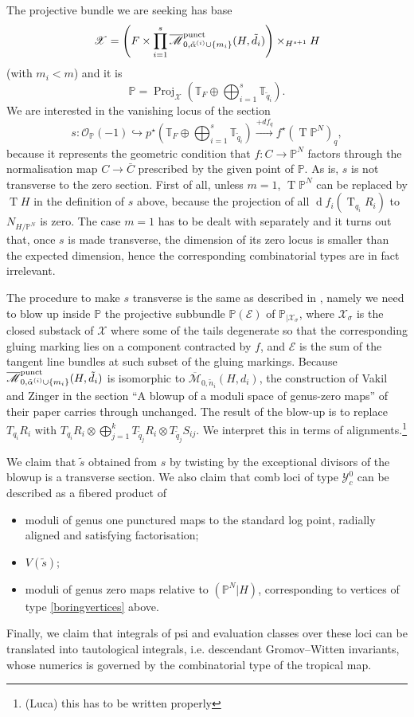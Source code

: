\documentclass[11pt]{amsart}
\newcommand{\oM}{\overline{\mathcal{M}}}
\newcommand{\M}[4]{\overline{\mathcal{M}}_{#1,#2}(#3,#4)}
\newcommand{\PP}{\mathbb P}
\newcommand{\st}{\star}
\newcommand{\OO}{\mathcal{O}}
\renewcommand{\to}{\rightarrow}
\newcommand{\Proj}{\operatorname{Proj}}
\theoremstyle{definition}
\theoremstyle{definition}
\begin{document}
The projective bundle we are seeking has base
\[\mathcal X=\left(F\times \prod_{i=1}^s\oM_{0,\tilde\alpha^{(i)}\cup\{m_i\}}^{\rm{punct}}(H,\tilde d_i)\right)\times_{H^{s+1}}H\]
(with $m_i<m$) and it is \[\PP=\Proj_{\mathcal X}\left(\mathbb T_F\oplus\bigoplus_{i=1}^s\mathbb T_{\tilde q_i}\right).\]
We are interested in the vanishing locus of the section
\[s\colon\OO_{\PP}(-1)\hookrightarrow p^\st\left(\mathbb T_F\oplus\bigoplus_{i=1}^s\mathbb T_{\tilde q_i}\right)\xrightarrow{+df_q} f^\st(\operatorname{T}\PP^N)_q,\]
because it represents the geometric condition that $f\colon C\to \PP^N$ factors through the normalisation map $C\to\bar C$ prescribed by the given point of $\PP$. As is, $s$ is not transverse to the zero section. First of all, unless $m=1$, $\operatorname{T}\PP^N$ can be replaced by $\operatorname{T}H$ in the definition of $s$ above, because the projection of all $\operatorname{d}f_i(\operatorname{T}_{q_i}R_i)$ to $N_{H/\PP^N}$ is zero. The case $m=1$ has to be dealt with separately and it turns out that, once $s$ is made transverse, the dimension of its zero locus is smaller than the expected dimension, hence the corresponding combinatorial types are in fact irrelevant.

The procedure to make $s$ transverse is the same as described in \cite[\S 3]{VZ}, namely we need to blow up inside $\PP$ the projective subbundle $\PP(\mathcal E)$ of $\PP_{|\mathcal X_\sigma}$, where $\mathcal X_\sigma$ is the closed substack of $\mathcal X$ where some of the tails degenerate so that the corresponding gluing marking lies on a component contracted by $f$, and $\mathcal E$ is the sum of the tangent line bundles at such subset of the gluing markings. Because $\oM_{0,\tilde\alpha^{(i)}\cup\{m_i\}}^{\rm{punct}}(H,\tilde d_i)$ is isomorphic to $\M{0}{\tilde n_i}{H}{d_i}$, the construction of Vakil and Zinger in the section ``A blowup of a moduli space of genus-zero maps'' of their paper carries through unchanged. The result of the blow-up is to replace $T_{q_i}R_i$ with $T_{q_i}R_i\otimes\bigoplus_{j=1}^kT_{\tilde q_j}R_i\otimes T_{\tilde q_j} S_{ij}$. We interpret this in terms of alignments.\footnote{(Luca) this has to be written properly}

We claim that $\tilde s$ obtained from $s$ by twisting by the exceptional divisors of the blowup is a transverse section. We also claim that comb loci of type $\mathcal Y_c^0$ can be described as a fibered product of 
\begin{itemize}
 \item moduli of genus one punctured maps to the standard log point, radially aligned and satisfying factorisation;
 \item $V(\tilde s)$;
 \item moduli of genus zero maps relative to $(\PP^N|H)$, corresponding to vertices of type \ref{boringvertices} above.
\end{itemize}
Finally, we claim that integrals of psi and evaluation classes over these loci can be translated into tautological integrals, i.e. descendant Gromov--Witten invariants, whose numerics is governed by the combinatorial type of the tropical map.
\end{document}
